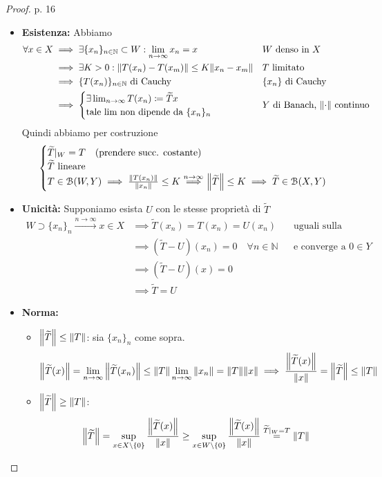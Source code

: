 \documentclass[a4paper,10pt]{article}
\theoremstyle{definition}
\newcommand{\na}{\mathbb{N}} %
\theoremstyle{indentdefinition}
\theoremstyle{indenttheorem}
\theoremstyle{myremark}
\theoremstyle{indentgeneral}
\begin{document}
\begin{proof}p. 16
\begin{itemize}
    \item \textbf{Esistenza:} Abbiamo
    \begin{align*}
        \forall x \in X &\implies \exists \{x_n\}_{n\in\na}\subset W: \lim_{n\to\infty}x_n=x && \text{$W$ denso in $X$}\\
        &\implies \exists K>0: \norm{T(x_n)-T(x_m)}\le K\norm{x_n-x_m} && \text{$T$ limitato}\\
        &\implies\{T(x_n)\}_{n\in\na} \text{ di Cauchy} && \text{$\{x_n\}$ di Cauchy}\\
        &\implies \begin{cases}
            \exists \lim_{n\to\infty} T(x_n)\coloneqq\widetilde{T}x\\
            \text{tale lim non dipende da } \{x_n\}_n
        \end{cases} && \text{$Y$ di Banach, $\norm{\cdot}$ continuo}
    \end{align*}
    Quindi abbiamo per costruzione
    $$\begin{cases}
        \widetilde{T}|_W= T \quad \text{(prendere succ. costante)}\\
        \widetilde{T} \text{ lineare}\\
        T\in\mathcal{B}(W,Y)\implies \frac{\norm{T(x_n)}}{\norm{x_n}}\le K \overset{n\to\infty}{\implies}\norm{\widetilde{T}}\le K\implies\widetilde{T}\in\mathcal{B}(X,Y)
    \end{cases}$$
    \item \textbf{Unicità:} Supponiamo esista $U$ con le stesse proprietà di $\widetilde{T}$
    \begin{align*}
        W\supset\{x_n\}_n\overset{n\to\infty}{\longrightarrow}x\in X &\implies \widetilde{T}(x_n)=T(x_n)=U(x_n) && \text{uguali sulla restrizione}\\
        &\implies (\widetilde{T}-U)(x_n)=0 \quad \forall n\in\na && \text{e converge a }0\in Y\\
        &\implies(\widetilde{T}-U)(x)=0 \\
        &\implies \widetilde{T}=U
        \end{align*}
    \item \textbf{Norma:}
    \begin{itemize}
        \item \underline{$\norm{\widetilde{T}}\le \norm{T}$}: sia $\{x_n\}_n$ come sopra.
        $$\norm{\widetilde{T}(x)}=\lim_{n\to\infty}\norm{\widetilde{T}(x_n)}\le \norm{T}\lim_{n\to\infty}\norm{x_n}=\norm{T}\norm{x}\implies\frac{\norm{\widetilde{T}(x)}}{\norm{x}}=\norm{\widetilde{T}}\le \norm{T}$$
        
        \item \underline{$\norm{\widetilde{T}}\ge \norm{T}$}:
        $$\norm{\widetilde{T}}=\sup_{x\in X\setminus\{0\}}\frac{\norm{\widetilde{T}(x)}}{\norm{x}}\ge\sup_{x\in W\setminus\{0\}}\frac{\norm{\widetilde{T}(x)}}{\norm{x}}\overset{\widetilde{T}|_W=T}{=}\norm{T}$$
    \end{itemize}
\end{itemize}
\end{proof}
\end{document}
